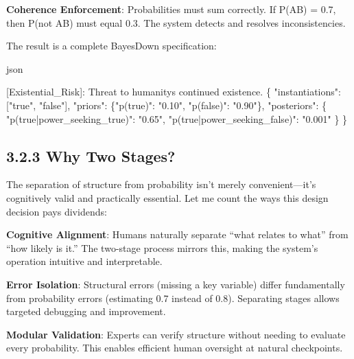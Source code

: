 \documentclass[
  11pt,
  letterpaper,
]{book}
\newenvironment{Shaded}{\begin{snugshade}}{\end{snugshade}}
\newcommand{\DataTypeTok}[1]{\textcolor[rgb]{0.68,0.00,0.00}{#1}}
\newcommand{\ErrorTok}[1]{\textcolor[rgb]{0.68,0.00,0.00}{#1}}
\newcommand{\FunctionTok}[1]{\textcolor[rgb]{0.28,0.35,0.67}{#1}}
\newcommand{\OtherTok}[1]{\textcolor[rgb]{0.00,0.23,0.31}{#1}}
\newcommand{\StringTok}[1]{\textcolor[rgb]{0.13,0.47,0.30}{#1}}
\begin{document}
\textbf{Coherence Enforcement}: Probabilities must sum correctly. If
P(A\textbar B) = 0.7, then P(not A\textbar B) must equal 0.3. The system
detects and resolves inconsistencies.

The result is a complete BayesDown specification:

json

\begin{Shaded}
\begin{Highlighting}[]
\OtherTok{[}\ErrorTok{Existential\_Risk}\OtherTok{]}\ErrorTok{:} \ErrorTok{Threat} \ErrorTok{to} \ErrorTok{humanity\textquotesingle{}s} \ErrorTok{continued} \ErrorTok{existence.} \FunctionTok{\{}
  \DataTypeTok{"instantiations"}\FunctionTok{:} \OtherTok{[}\StringTok{"true"}\OtherTok{,} \StringTok{"false"}\OtherTok{]}\FunctionTok{,}
  \DataTypeTok{"priors"}\FunctionTok{:} \FunctionTok{\{}\DataTypeTok{"p(true)"}\FunctionTok{:} \StringTok{"0.10"}\FunctionTok{,} \DataTypeTok{"p(false)"}\FunctionTok{:} \StringTok{"0.90"}\FunctionTok{\},}
  \DataTypeTok{"posteriors"}\FunctionTok{:} \FunctionTok{\{}
    \DataTypeTok{"p(true|power\_seeking\_true)"}\FunctionTok{:} \StringTok{"0.65"}\FunctionTok{,}
    \DataTypeTok{"p(true|power\_seeking\_false)"}\FunctionTok{:} \StringTok{"0.001"}
  \FunctionTok{\}}
\FunctionTok{\}}
\end{Highlighting}
\end{Shaded}

\subsection{3.2.3 Why Two Stages?}\label{sec-why-two-stages}

The separation of structure from probability isn't merely
convenient---it's cognitively valid and practically essential. Let me
count the ways this design decision pays dividends:

\textbf{Cognitive Alignment}: Humans naturally separate ``what relates
to what'' from ``how likely is it.'' The two-stage process mirrors this,
making the system's operation intuitive and interpretable.

\textbf{Error Isolation}: Structural errors (missing a key variable)
differ fundamentally from probability errors (estimating 0.7 instead of
0.8). Separating stages allows targeted debugging and improvement.

\textbf{Modular Validation}: Experts can verify structure without
needing to evaluate every probability. This enables efficient human
oversight at natural checkpoints.
\end{document}
